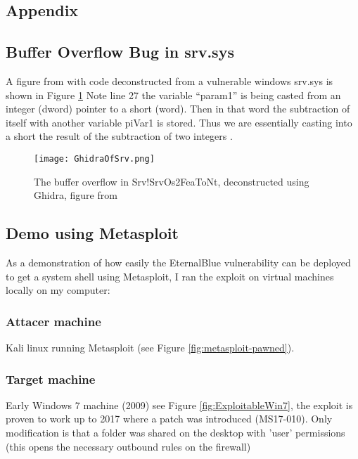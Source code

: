 \documentclass[
	letterpaper, %
	10pt, %
	unnumberedsections, %
	twoside, %
]{LTJournalArticle}
\begin{document}
\clearpage
\begin{appendices}
\onecolumn
\appendix
\section{Appendix} \label{Appendix}

\subsection{Buffer Overflow Bug in srv.sys}
A figure from \cite{h3xduck} with code deconstructed from a vulnerable windows srv.sys is shown in Figure \ref{fig:Ghidra_srv.sys}
\newline
Note line 27 the variable “param1” is being casted from an integer (dword) pointer to a short (word). Then in that word the subtraction of itself with another variable piVar1 is stored. Thus we are essentially casting into a short the result of the subtraction of two integers \cite{h3xduck}.



\begin{figure}[ht] %
	\texttt{[image: GhidraOfSrv.png]}
	\caption{The buffer overflow in Srv!SrvOs2FeaToNt, deconstructed using Ghidra, figure from \cite{h3xduck}}
	\label{fig:Ghidra_srv.sys}
\end{figure}



\subsection{Demo using Metasploit}
As a demonstration of how easily the EternalBlue vulnerability can be deployed to get a system shell using Metasploit, I ran the exploit on virtual machines locally on my computer:
\subsubsection[short]{Attacer machine} Kali linux running Metasploit (see Figure \ref{fig:metasploit-pawned}).



\subsubsection[short]{Target machine}
Early Windows 7 machine (2009) see Figure \ref{fig:ExploitableWin7}, the exploit is proven to work up to 2017 where a patch was introduced (MS17-010).
Only modification is that a folder was shared on the desktop with 'user' permissions (this opens the necessary outbound rules on the firewall)


\end{appendices}
\end{document}
